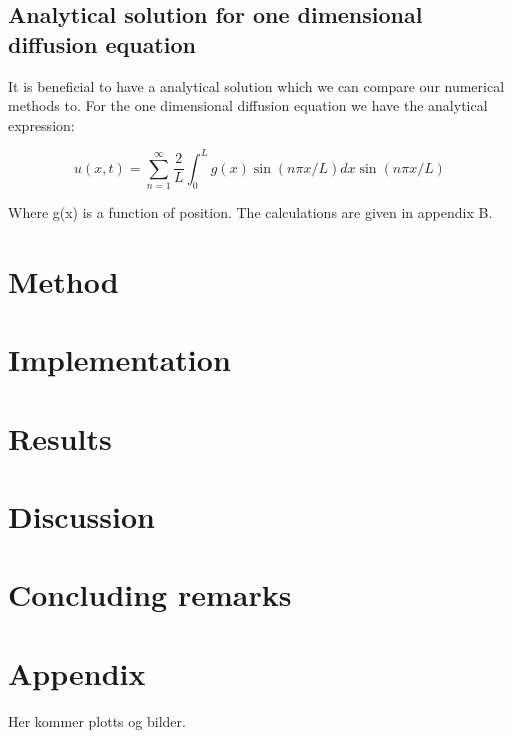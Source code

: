\documentclass{article}
\begin{document}
\begin{multicols}{2}
\subsection{Analytical solution for one dimensional diffusion equation}

It is beneficial to have a analytical solution which we can compare our numerical methods to. For the one dimensional diffusion equation we have the analytical expression:

\begin{equation}
u(x,t) = \sum_{n=1}^{\infty}\frac{2}{L}\int_0^Lg(x)\sin{(n\pi x/L)} dx\sin{(n\pi x/L)}
\end{equation}

Where g(x) is a function of position. The calculations are given in appendix B. 


\section{Method}

\section{Implementation}



\section{Results}


\section{Discussion}



\section{Concluding remarks}




\end{multicols}

\clearpage

\appendix %

\section{Appendix}

Her kommer plotts og bilder. 
\end{document}
